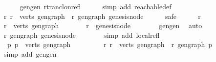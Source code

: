 \begin{isabellebody}
\ \ \ \ \isamarkupfalse%
\ gen{\isacharunderscore}{\kern0pt}gen\ rtrancl{\isacharunderscore}{\kern0pt}on{\isacharunderscore}{\kern0pt}refl\isanewline
\ \ \ \ \isamarkupfalse%
\ {\isacharparenleft}{\kern0pt}simp\ add{\isacharcolon}{\kern0pt}\ reachable{\isacharunderscore}{\kern0pt}def{\isacharparenright}{\kern0pt}\ \isanewline
\ \ \isamarkupfalse%
\ {\isachardoublequoteopen}{\isasymforall}r{\isachardot}{\kern0pt}\ r\ {\isasymin}\ verts\ gen{\isacharunderscore}{\kern0pt}graph\ {\isasymlongrightarrow}\ r\ {\isasymrightarrow}\isactrlsup {\isacharasterisk}{\kern0pt}\isactrlbsub gen{\isacharunderscore}{\kern0pt}graph\isactrlesub \ genesis{\isacharunderscore}{\kern0pt}node{\isachardoublequoteclose}\ \ \isanewline
\ \ \isamarkupfalse%
\ safe\isanewline
\ \ \ \ \isamarkupfalse%
\ r\isanewline
\ \ \ \ \isamarkupfalse%
\ {\isachardoublequoteopen}r\ {\isasymin}\ verts\ gen{\isacharunderscore}{\kern0pt}graph{\isachardoublequoteclose}\isanewline
\ \ \ \ \isamarkupfalse%
\ \isamarkupfalse%
\ {\isachardoublequoteopen}r\ {\isacharequal}{\kern0pt}\ genesis{\isacharunderscore}{\kern0pt}node{\isachardoublequoteclose}\isanewline
\ \ \ \ \ \ \isamarkupfalse%
\ gen{\isacharunderscore}{\kern0pt}gen\ \isamarkupfalse%
\ auto\isanewline
\ \ \ \ \isamarkupfalse%
\ \isamarkupfalse%
\ {\isachardoublequoteopen}r\ {\isasymrightarrow}\isactrlsup {\isacharasterisk}{\kern0pt}\isactrlbsub gen{\isacharunderscore}{\kern0pt}graph\isactrlesub \ genesis{\isacharunderscore}{\kern0pt}node{\isachardoublequoteclose}\isanewline
\ \ \ \ \ \ \isamarkupfalse%
\ {\isacharparenleft}{\kern0pt}simp\ add{\isacharcolon}{\kern0pt}\ local{\isachardot}{\kern0pt}refl{\isacharparenright}{\kern0pt}\ \ \ \isanewline
\ \ \isamarkupfalse%
\isanewline
\ \ \isamarkupfalse%
\ \isamarkupfalse%
\ {\isachardoublequoteopen}\ {\isasymexists}p{\isachardot}{\kern0pt}\ p\ {\isasymin}\ verts\ gen{\isacharunderscore}{\kern0pt}graph\ {\isasymand}\isanewline
\ \ \ \ \ \ \ \ {\isacharparenleft}{\kern0pt}{\isasymforall}r{\isachardot}{\kern0pt}\ r\ {\isasymin}\ verts\ gen{\isacharunderscore}{\kern0pt}graph\ {\isasymlongrightarrow}\ r\ {\isasymrightarrow}\isactrlsup {\isacharasterisk}{\kern0pt}\isactrlbsub gen{\isacharunderscore}{\kern0pt}graph\isactrlesub \ p{\isacharparenright}{\kern0pt}{\isachardoublequoteclose}\isanewline
\ \ \ \ \isamarkupfalse%
\ {\isacharparenleft}{\kern0pt}simp\ add{\isacharcolon}{\kern0pt}\ gen{\isacharunderscore}{\kern0pt}gen{\isacharparenright}{\kern0pt}\isanewline

\end{isabellebody}
